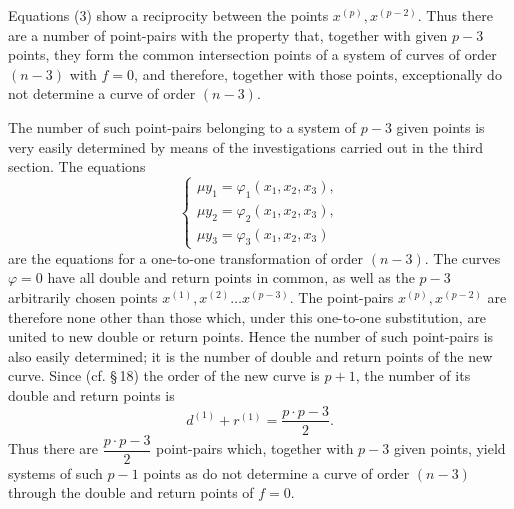 \documentclass[10pt]{article}
\begin{document}
Equations (3) show a reciprocity between the points \(x^{(p)},x^{(p-2)}\). Thus there are a number of point-pairs with the property that, together with given \(p-3\) points, they form the common intersection points of a system of curves of order \((n-3)\) with \(f=0\), and therefore, together with those points, exceptionally do not determine a curve of order \((n-3)\).

The number of such point-pairs belonging to a system of \(p-3\) given points is very easily determined by means of the investigations carried out in the third section. The equations
\[
\tag{4}
\begin{cases}
\mu y_1=\varphi_1(x_1,x_2,x_3),\\
\mu y_2=\varphi_2(x_1,x_2,x_3),\\
\mu y_3=\varphi_3(x_1,x_2,x_3)
\end{cases}
\]
are the equations for a one-to-one transformation of order \((n-3)\). The curves \(\varphi=0\) have all double and return points in common, as well as the \(p-3\) arbitrarily chosen points \(x^{(1)},x^{(2)}\ldots x^{(p-3)}\). The point-pairs \(x^{(p)},x^{(p-2)}\) are therefore none other than those which, under this one-to-one substitution, are united to new double or return points. Hence the number of such point-pairs is also easily determined; it is the number of double and return points of the new curve. Since (cf. \S\,18) the order of the new curve is \(p+1\), the number of its double and return points is
\[
d^{(1)}+r^{(1)}=\frac{p\cdot p-3}{2}.
\]
Thus there are \(\dfrac{p\cdot p-3}{2}\) point-pairs which, together with \(p-3\) given points, yield systems of such \(p-1\) points as do not determine a curve of order \((n-3)\) through the double and return points of \(f=0\).
\end{document}
